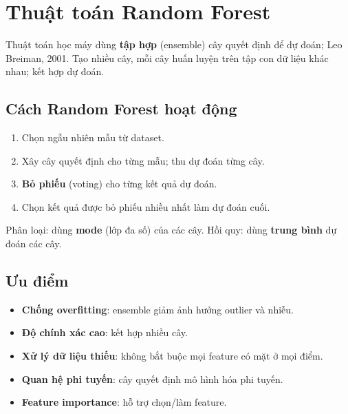 \section{Thuật toán Random Forest}
\label{sec:random-forest}

\begin{dinhnghia}[title={Random Forest}]
Thuật toán học máy dùng \textbf{tập hợp} (ensemble) cây quyết định để dự đoán; Leo Breiman, 2001.
Tạo nhiều cây, mỗi cây huấn luyện trên tập con dữ liệu khác nhau; kết hợp dự đoán.
\end{dinhnghia}

\subsection{Cách Random Forest hoạt động}

\begin{phuongphap}[title={Các bước}]
\begin{enumerate}
  \item Chọn ngẫu nhiên mẫu từ dataset.
  \item Xây cây quyết định cho từng mẫu; thu dự đoán từng cây.
  \item \textbf{Bỏ phiếu} (voting) cho từng kết quả dự đoán.
  \item Chọn kết quả được bỏ phiếu nhiều nhất làm dự đoán cuối.
\end{enumerate}
\end{phuongphap}


\begin{ynghia}[title={Phân loại và hồi quy}]
Phân loại: dùng \textbf{mode} (lớp đa số) của các cây.
Hồi quy: dùng \textbf{trung bình} dự đoán các cây.
\end{ynghia}

\subsection{Ưu điểm}

\begin{tinhchat}[title={Ưu điểm chính}]
\begin{itemize}
  \item \textbf{Chống overfitting}: ensemble giảm ảnh hưởng outlier và nhiễu.
  \item \textbf{Độ chính xác cao}: kết hợp nhiều cây.
  \item \textbf{Xử lý dữ liệu thiếu}: không bắt buộc mọi feature có mặt ở mọi điểm.
  \item \textbf{Quan hệ phi tuyến}: cây quyết định mô hình hóa phi tuyến.
  \item \textbf{Feature importance}: hỗ trợ chọn/làm feature.
\end{itemize}
\end{tinhchat}


